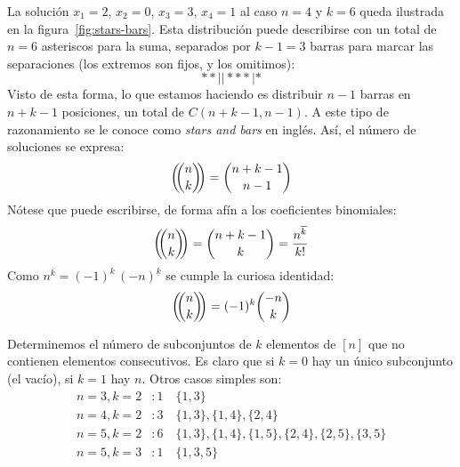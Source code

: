 \begin{description}
    La solución \(x_1 = 2\), \(x_2 = 0\), \(x_3 = 3\), \(x_4 = 1\)
    al caso \(n = 4\) y \(k = 6\)
    queda ilustrada en la figura~\ref{fig:stars-bars}.
    Esta distribución puede describirse
    con un total de \(n = 6\) asteriscos para la suma,
    separados por \(k - 1 = 3\) barras para marcar las separaciones
    (los extremos son fijos,
     y los omitimos):
    \begin{equation*}
      ** | | *** | *
    \end{equation*}
    Visto de esta forma,
    lo que estamos haciendo es distribuir \(n - 1\) barras
    en \(n + k - 1\) posiciones,
    un total de \(C(n + k - 1, n - 1)\).
    A este tipo de razonamiento se le conoce
    como \emph{\foreignlanguage{english}{stars and bars}}%
    en inglés.
    Así,
    el número de soluciones se expresa:
    \begin{equation*}
      \left( \!\! \binom{n}{k} \!\! \right)
	= \binom{n + k - 1}{n - 1}
    \end{equation*}
    Nótese que puede escribirse,
    de forma afín a los coeficientes binomiales:
    \begin{equation*}
      \left( \!\! \binom{n}{k} \!\! \right)
	= \binom{n + k - 1}{k}
	= \frac{n^{\overline{k}}}{k!}
    \end{equation*}
    Como \(n^{\overline{k}} = (-1)^k \, (-n)^{\underline{k}}\)
    se cumple la curiosa identidad:
    \begin{equation}
      \label{eq:multiset=negative-binomial}
      \left( \!\! \binom{n}{k} \!\! \right)
	= (-1)^k \binom{-n}{k}
    \end{equation}
  \end{description}

  Determinemos el número de subconjuntos
  de \(k\) elementos de \([n]\)
  que no contienen elementos consecutivos.%
  Es claro que si \(k = 0\) hay un único subconjunto
  (el vacío),
  si \(k = 1\) hay \(n\).
  Otros casos simples son:
  \begin{align*}
    n = 3, k = 2 &\colon 1 \quad \{1, 3\} \\
    n = 4, k = 2 &\colon 3 \quad \{1, 3\}, \{1, 4\}, \{2, 4\} \\
    n = 5, k = 2 &\colon 6 \quad \{1, 3\}, \{1, 4\}, \{1, 5\},
				 \{2, 4\}, \{2, 5\},
				 \{3, 5\} \\
    n = 5, k = 3 &\colon 1 \quad \{1, 3, 5\}
  \end{align*}

